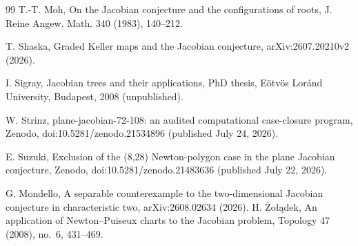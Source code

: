 \documentclass[11pt]{article}
\theoremstyle{definition}
\theoremstyle{remark}
\begin{document}
\begin{thebibliography}{99}
 T.-T. Moh, On the Jacobian conjecture and the configurations of roots, J. Reine Angew. Math. 340 (1983), 140--212.

 T. Shaska, Graded Keller maps and the Jacobian conjecture, arXiv:2607.20210v2 (2026).

 I. Sigray, Jacobian trees and their applications, PhD thesis, E\"otv\"os Lor\'and University, Budapest, 2008 (unpublished).

 W. Strinz, plane-jacobian-72-108: an audited computational case-closure program, Zenodo, doi:10.5281/zenodo.21534896 (published July 24, 2026).

 E. Suzuki, Exclusion of the (8,28) Newton-polygon case in the plane Jacobian conjecture, Zenodo, doi:10.5281/zenodo.21483636 (published July 22, 2026).

 G. Mondello, A separable counterexample to the two-dimensional Jacobian conjecture in characteristic two, arXiv:2608.02634 (2026).
 H. \.Zo{\l}\k{a}dek, An application of Newton--Puiseux charts to the Jacobian problem, Topology 47 (2008), no.\ 6, 431--469.

\end{thebibliography}
\end{document}
